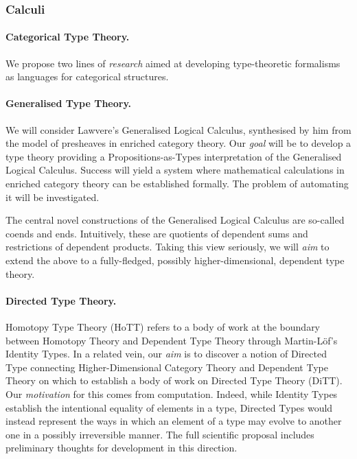 \documentclass[11pt,twocolumn]{article}
\newcommand{\hl}{\emph}
\begin{document}
\subsubsection{Calculi}
\label{CalculiSubsection}

\paragraph*{Categorical Type Theory.}

We propose two lines of \hl{research} aimed at developing type-theoretic
formalisms as languages for categorical structures.

\paragraph{Generalised Type Theory.}
\label{GeneralisedTypeTheoryParagraph}

We will consider Lawvere's Generalised Logical Calculus, %
synthesised by him from the model of presheaves in enriched category theory.
Our \hl{goal} will be to develop a type theory providing a
Propositions-as-Types interpretation of the Generalised Logical Calculus.
Success will yield a system where mathematical calculations in enriched
category theory can be established formally.  The problem of automating it
will be investigated.

The central novel constructions of the Generalised Logical Calculus are
so-called coends and ends.  Intuitively, these are quotients of dependent sums
and restrictions of dependent products.  Taking this view seriously, we will
\hl{aim} to extend the above to a fully-fledged, possibly
higher-dimensional, dependent type theory.  

\paragraph{Directed Type Theory.}
\label{DirectedTypeTheoryParagraph}

Homotopy Type Theory (HoTT) refers to a body of work at the boundary between
Homotopy Theory and Dependent Type Theory through Martin-L\"of's Identity
Types. %
In a related vein, our \hl{aim} is to discover a notion of Directed Type
connecting Higher-Dimensional Category Theory and Dependent Type Theory on
which to establish a body of work on Directed Type Theory (DiTT).  Our
\hl{motivation} for this comes from computation.  Indeed, while Identity
Types establish the intentional equality of elements in a type, Directed Types
would instead represent the ways in which an element of a type may evolve to
another one in a possibly irreversible manner.  The full scientific proposal
includes preliminary thoughts for development in this direction.
\end{document}
